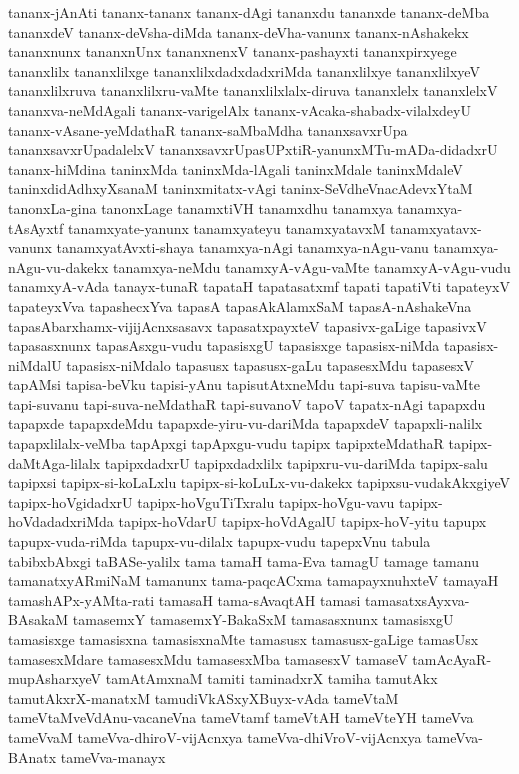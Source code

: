 {tananx-jAnAti
tananx-tananx
tananx-dAgi
tananxdu
tananxde
tananx-deMba
tananxdeV
tananx-deVsha-diMda
tananx-deVha-vanunx
tananx-nAshakekx
tananxnunx
tananxnUnx
tananxnenxV
tananx-pashayxti
tananxpirxyege
tananxlilx
tananxlilxge
tananxlilxdadxdadxriMda
tananxlilxye
tananxlilxyeV
tananxlilxruva
tananxlilxru-vaMte
tananxlilxlalx-diruva
tananxlelx
tananxlelxV
tananxva-neMdAgali
tananx-varigelAlx
tananx-vAcaka-shabadx-vilalxdeyU
tananx-vAsane-yeMdathaR
tananx-saMbaMdha
tananxsavxrUpa
tananxsavxrUpadalelxV
tananxsavxrUpasUPxtiR-yanunxMTu-mADa-didadxrU
tananx-hiMdina
taninxMda
taninxMda-lAgali
taninxMdale
taninxMdaleV
taninxdidAdhxyXsanaM
taninxmitatx-vAgi
taninx-SeVdheVnacAdevxYtaM
tanonxLa-gina
tanonxLage
tanamxtiVH
tanamxdhu
tanamxya
tanamxya-tAsAyxtf
tanamxyate-yanunx
tanamxyateyu
tanamxyatavxM
tanamxyatavx-vanunx
tanamxyatAvxti-shaya
tanamxya-nAgi
tanamxya-nAgu-vanu
tanamxya-nAgu-vu-dakekx
tanamxya-neMdu
tanamxyA-vAgu-vaMte
tanamxyA-vAgu-vudu
tanamxyA-vAda
tanayx-tunaR
tapataH
tapatasatxmf
tapati
tapatiVti
tapateyxV
tapateyxVva
tapashecxYva
tapasA
tapasAkAlamxSaM
tapasA-nAshakeVna
tapasAbarxhamx-vijijAcnxsasavx
tapasatxpayxteV
tapasivx-gaLige
tapasivxV
tapasasxnunx
tapasAsxgu-vudu
tapasisxgU
tapasisxge
tapasisx-niMda
tapasisx-niMdalU
tapasisx-niMdalo
tapasusx
tapasusx-gaLu
tapasesxMdu
tapasesxV
tapAMsi
tapisa-beVku
tapisi-yAnu
tapisutAtxneMdu
tapi-suva
tapisu-vaMte
tapi-suvanu
tapi-suva-neMdathaR
tapi-suvanoV
tapoV
tapatx-nAgi
tapapxdu
tapapxde
tapapxdeMdu
tapapxde-yiru-vu-dariMda
tapapxdeV
tapapxli-nalilx
tapapxlilalx-veMba
tapApxgi
tapApxgu-vudu
tapipx
tapipxteMdathaR
tapipx-daMtAga-lilalx
tapipxdadxrU
tapipxdadxlilx
tapipxru-vu-dariMda
tapipx-salu
tapipxsi
tapipx-si-koLaLxlu
tapipx-si-koLuLx-vu-dakekx
tapipxsu-vudakAkxgiyeV
tapipx-hoVgidadxrU
tapipx-hoVguTiTxralu
tapipx-hoVgu-vavu
tapipx-hoVdadadxriMda
tapipx-hoVdarU
tapipx-hoVdAgalU
tapipx-hoV-yitu
tapupx
tapupx-vuda-riMda
tapupx-vu-dilalx
tapupx-vudu
tapepxVnu
tabula
tabibxbAbxgi
taBASe-yalilx
tama
tamaH
tama-Eva
tamagU
tamage
tamanu
tamanatxyARmiNaM
tamanunx
tama-paqcACxma
tamapayxnuhxteV
tamayaH
tamashAPx-yAMta-rati
tamasaH
tama-sAvaqtAH
tamasi
tamasatxsAyxva-BAsakaM
tamasemxY
tamasemxY-BakaSxM
tamasasxnunx
tamasisxgU
tamasisxge
tamasisxna
tamasisxnaMte
tamasusx
tamasusx-gaLige
tamasUsx
tamasesxMdare
tamasesxMdu
tamasesxMba
tamasesxV
tamaseV
tamAcAyaR-mupAsharxyeV
tamAtAmxnaM
tamiti
taminadxrX
tamiha
tamutAkx
tamutAkxrX-manatxM
tamudiVkASxyXBuyx-vAda
tameVtaM
tameVtaMveVdAnu-vacaneVna
tameVtamf
tameVtAH
tameVteYH
tameVva
tameVvaM
tameVva-dhiroV-vijAcnxya
tameVva-dhiVroV-vijAcnxya
tameVva-BAnatx
tameVva-manayx
}
